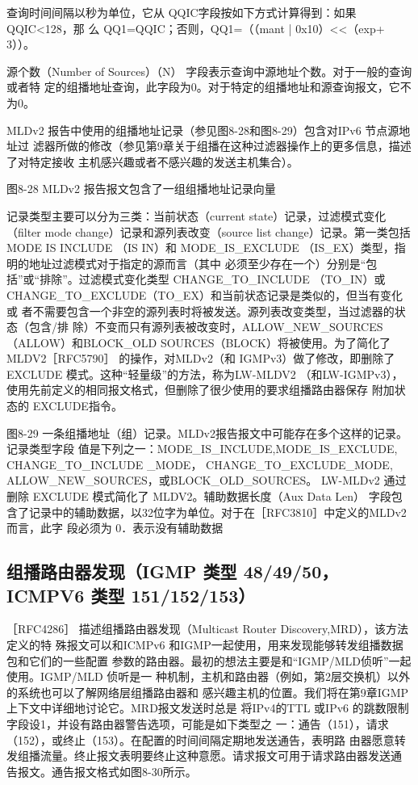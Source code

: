 查询时间间隔以秒为单位，它从 QQIC字段按如下方式计算得到：如果QQIC<128，那
么 QQ1=QQIC；否则，QQ1=（（mant | 0x10）<<（exp+ 3））。

源个数（Number of Sources）（N） 字段表示查询中源地址个数。对于一般的查询或者特
定的组播地址查询，此字段为0。对于特定的组播地址和源查询报文，它不为0。

MLDv2 报告中使用的组播地址记录（参见图8-28和图8-29）包含对IPv6 节点源地址过
滤器所做的修改（参见第9章关于组播在这种过滤器操作上的更多信息，描述了对特定接收
主机感兴趣或者不感兴趣的发送主机集合）。

图8-28 MLDv2 报告报文包含了一组组播地址记录向量

记录类型主要可以分为三类：当前状态（current state）记录，过滤模式变化（filter mode
change）记录和源列表改变（source list change）记录。第一类包括 MODE IS INCLUDE （IS
IN）和 MODE\_IS\_EXCLUDE （IS\_EX）类型，指明的地址过滤模式对于指定的源而言（其中
必须至少存在一个）分别是“包括”或“排除”。过滤模式变化类型 CHANGE\_TO\_INCLUDE
（TO\_IN）或CHANGE\_TO\_EXCLUDE（TO\_EX）和当前状态记录是类似的，但当有变化或
者不需要包含一个非空的源列表时将被发送。源列表改变类型，当过滤器的状态（包含/排
除）不变而只有源列表被改变时，ALLOW\_NEW\_SOURCES（ALLOW）和BLOCK\_OLD
SOURCES（BLOCK）将被使用。为了简化了MLDV2［RFC5790］ 的操作，对MLDv2（和
IGMPv3）做了修改，即删除了 EXCLUDE 模式。这种“轻量级”的方法，称为LW-MLDV2
（和LW-IGMPv3），使用先前定义的相同报文格式，但删除了很少使用的要求组播路由器保存
附加状态的 EXCLUDE指令。

图8-29 一条组播地址（组）记录。MLDv2报告报文中可能存在多个这样的记录。记录类型字段
值是下列之一：MODE\_IS\_INCLUDE,MODE\_IS\_EXCLUDE, CHANGE\_TO\_INCLUDE \_MODE，
CHANGE\_TO\_EXCLUDE\_MODE, ALLOW\_NEW\_SOURCES，或BLOCK\_OLD\_SOURCES。
LW-MLDv2 通过删除 EXCLUDE 模式简化了 MLDV2。辅助数据长度（Aux Data Len） 字段包
含了记录中的辅助数据，以32位字为单位。对于在［RFC3810］中定义的MLDv2 而言，此字
段必须为 0．表示没有辅助数据

\subsection{组播路由器发现（IGMP 类型 48/49/50，ICMPV6 类型 151/152/153）}
［RFC4286］ 描述组播路由器发现（Multicast Router Discovery,MRD），该方法定义的特
殊报文可以和ICMPv6 和IGMP一起使用，用来发现能够转发组播数据包和它们的一些配置
参数的路由器。最初的想法主要是和“IGMP/MLD侦听”一起使用。IGMP/MLD 侦听是一
种机制，主机和路由器（例如，第2层交换机）以外的系统也可以了解网络层组播路由器和
感兴趣主机的位置。我们将在第9章IGMP上下文中详细地讨论它。MRD报文发送时总是
将IPv4的TTL 或IPv6 的跳数限制字段设1，并设有路由器警告选项，可能是如下类型之
一：通告（151），请求（152），或终止（153）。在配置的时间间隔定期地发送通告，表明路
由器愿意转发组播流量。终止报文表明要终止这种意愿。请求报文可用于请求路由器发送通
告报文。通告报文格式如图8-30所示。

